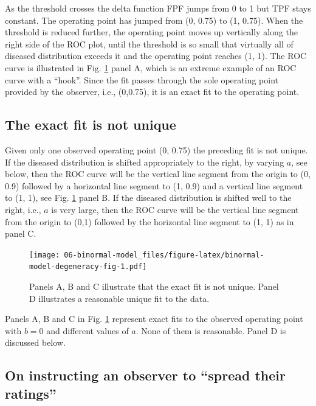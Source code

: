\documentclass[
]{book}
\begin{document}
As the threshold crosses the delta function FPF jumps from 0 to 1 but TPF stays constant. The operating point has jumped from (0, 0.75) to (1, 0.75). When the threshold is reduced further, the operating point moves up vertically along the right side of the ROC plot, until the threshold is so small that virtually all of diseased distribution exceeds it and the operating point reaches (1, 1). The ROC curve is illustrated in Fig. \ref{fig:binormal-model-degeneracy-fig} panel A, which is an extreme example of an ROC curve with a ``hook''. Since the fit passes through the sole operating point provided by the observer, i.e., (0,0.75), it is an exact fit to the operating point.

\hypertarget{binormal-model-exact-fit-not-unique}{%
\subsection{The exact fit is not unique}\label{binormal-model-exact-fit-not-unique}}

Given only one observed operating point (0, 0.75) the preceding fit is not unique. If the diseased distribution is shifted appropriately to the right, by varying \(a\), see below, then the ROC curve will be the vertical line segment from the origin to (0, 0.9) followed by a horizontal line segment to (1, 0.9) and a vertical line segment to (1, 1), see Fig. \ref{fig:binormal-model-degeneracy-fig} panel B. If the diseased distribution is shifted well to the right, i.e., \(a\) is very large, then the ROC curve will be the vertical line segment from the origin to (0,1) followed by the horizontal line segment to (1, 1) as in panel C.

\begin{figure}
\centering
\texttt{[image: 06-binormal-model\_files/figure-latex/binormal-model-degeneracy-fig-1.pdf]}
\caption{\label{fig:binormal-model-degeneracy-fig}Panels A, B and C illustrate that the exact fit is not unique. Panel D illustrates a reasonable unique fit to the data.}
\end{figure}

Panels A, B and C in Fig. \ref{fig:binormal-model-degeneracy-fig} represent exact fits to the observed operating point with \(b = 0\) and different values of \(a\). None of them is reasonable. Panel D is discussed below.

\hypertarget{binormal-model-spread-ratings}{%
\subsection{On instructing an observer to ``spread their ratings''}\label{binormal-model-spread-ratings}}
\end{document}

